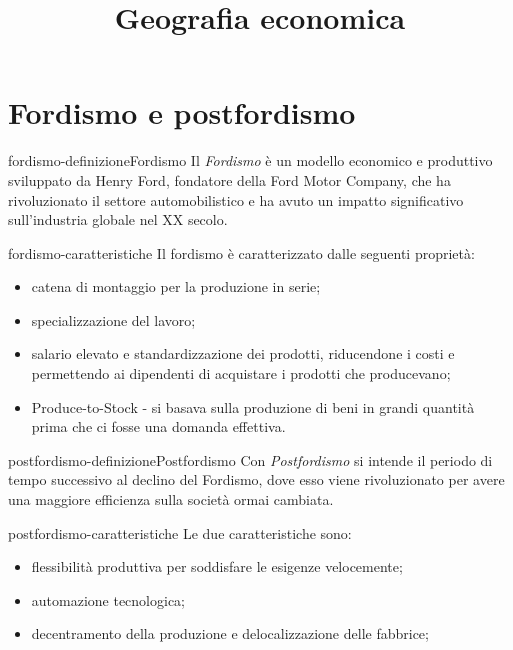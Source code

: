 \documentclass[preview]{standalone}
\begin{document}
\title{Geografia economica}
\genpage

\section{Fordismo e postfordismo}

\begin{snippetdefinition}{fordismo-definizione}{Fordismo}
    Il \textit{Fordismo} è un modello economico e produttivo sviluppato da Henry Ford,
    fondatore della Ford Motor Company, che ha rivoluzionato il settore automobilistico
    e ha avuto un impatto significativo sull'industria globale nel XX secolo.
\end{snippetdefinition}

\begin{snippet}{fordismo-caratteristiche}
    Il fordismo è caratterizzato dalle seguenti proprietà:
    \begin{itemize}
        \item catena di montaggio per la produzione in serie;
        \item specializzazione del lavoro;
        \item salario elevato e standardizzazione dei prodotti, riducendone i costi e permettendo ai dipendenti di acquistare i prodotti che producevano;
        \item Produce-to-Stock - si basava sulla produzione di beni in grandi quantità prima che ci fosse una domanda effettiva.
    \end{itemize}
\end{snippet}

\begin{snippetdefinition}{postfordismo-definizione}{Postfordismo}
    Con \textit{Postfordismo} si intende il periodo di tempo
    successivo al declino del Fordismo, dove esso viene rivoluzionato per avere una maggiore efficienza
    sulla società ormai cambiata.
\end{snippetdefinition}

\begin{snippet}{postfordismo-caratteristiche}
    Le due caratteristiche sono:
    \begin{itemize}
        \item flessibilità produttiva per soddisfare le esigenze velocemente;
        \item automazione tecnologica;
        \item decentramento della produzione e delocalizzazione delle fabbrice;
    \end{itemize}
\end{snippet}
\end{document}
